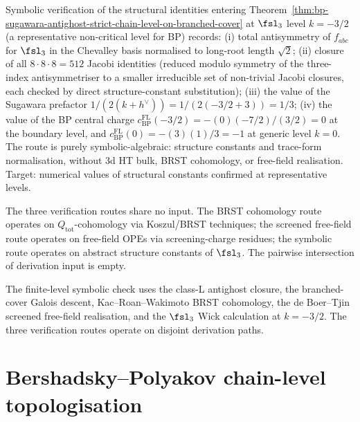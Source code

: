 \begin{remark}[Symbolic $\fsl_3$ Wick at $k = -3/2$]
\label{rem:bp-decorator-D3-SymPy}
Symbolic verification of the structural identities entering
Theorem~\ref{thm:bp-sugawara-antighost-strict-chain-level-on-branched-cover}
at $\fsl_3$ level $k = -3/2$ (a representative non-critical level for
BP) records: (i) total antisymmetry of $f_{abc}$ for $\fsl_3$ in the
Chevalley basis normalised to long-root length $\sqrt 2$; (ii) closure
of all $8 \cdot 8 \cdot 8 = 512$ Jacobi identities (reduced modulo
symmetry of the three-index antisymmetriser to a smaller irreducible
set of non-trivial Jacobi closures, each checked by direct
structure-constant substitution); (iii) the value of the Sugawara
prefactor $1/(2(k+h^{\vee})) = 1/(2(-3/2 + 3)) = 1/3$; (iv) the value
of the BP central charge
$c^{\mathrm{FL}}_{\mathrm{BP}}(-3/2) = -(0)(-7/2)/(3/2) = 0$ at the boundary level,
and $c^{\mathrm{FL}}_{\mathrm{BP}}(0) = -(3)(1)/3 = -1$ at generic level $k = 0$.
The route is purely symbolic-algebraic: structure constants and
trace-form normalisation, without 3d HT bulk, BRST cohomology, or
free-field realisation. Target: numerical values of structural
constants confirmed at representative levels.
\end{remark}

\begin{remark}
\label{rem:bp-disjointness}
The three verification routes share no input. The BRST cohomology
route operates on $Q_{\mathrm{tot}}$-cohomology via Koszul/BRST
techniques; the screened free-field route operates on free-field OPEs
via screening-charge residues; the symbolic route operates on abstract
structure constants of $\fsl_3$. The pairwise intersection of
derivation input is empty.
\end{remark}

\begin{remark}
\label{rem:bp-compute-module}
The finite-level symbolic check uses the class-L antighost closure,
the branched-cover Galois descent, Kac--Roan--Wakimoto BRST
cohomology, the de Boer--Tjin screened free-field realisation, and
the $\fsl_3$ Wick calculation at $k = -3/2$. The three verification
routes operate on disjoint derivation paths.
\end{remark}

\section{Bershadsky--Polyakov chain-level topologisation}
\label{sec:bp-summary-forward}

